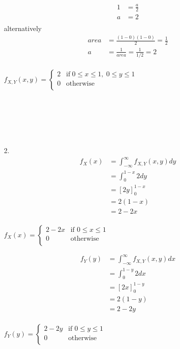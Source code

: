 \documentclass[12pt,border=4pt,multi]{article} %
\begin{document}
\begin{align*}
1 &= \frac{a}{2}\\
a &= 2\\
\end{align*}
alternatively
\begin{align*}
area &= \frac{(1 - 0)(1 - 0)}{2} = \frac{1}{2}\\
a &= \frac{1}{area} = \frac{1}{1 / 2} = 2\\
\end{align*}
\begin{center}
$\boxed{f_{X, Y}(x, y) = 
\begin{cases}
2 & \text{if}\; 0 \leq x \leq 1,\; 0 \leq y \leq 1\\
0 & \text{otherwise}\\
\end{cases}}$
\end{center}
\leavevmode
\\
\\
\\
\\
\\
2.
\begin{align*}
f_X(x) &= \int_{-\infty}^{\infty} f_{X, Y}(x, y) dy\\
&= \int_{0}^{1 - x} 2 dy\\
&= [2y]_0^{1 - x}\\
&= 2(1 - x)\\
&= 2 - 2x\\
\end{align*}
\begin{center}
$\boxed{f_X(x) =
\begin{cases}
2 - 2x & \text{if } 0 \leq x \leq 1\\
0 & \text{otherwise}\\
\end{cases}}$
\end{center}
\begin{align*}
f_Y(y) &= \int_{-\infty}^{\infty} f_{X, Y}(x, y) dx\\
&= \int_{0}^{1 - y} 2 dx\\
&= [2x]_0^{1 - y}\\
&= 2(1 - y)\\
&= 2 - 2y\\
\end{align*}
\begin{center}
$\boxed{f_Y(y) =
\begin{cases}
2 - 2y & \text{if } 0 \leq y \leq 1\\
0 & \text{otherwise}\\
\end{cases}}$
\end{center}
\end{document}
